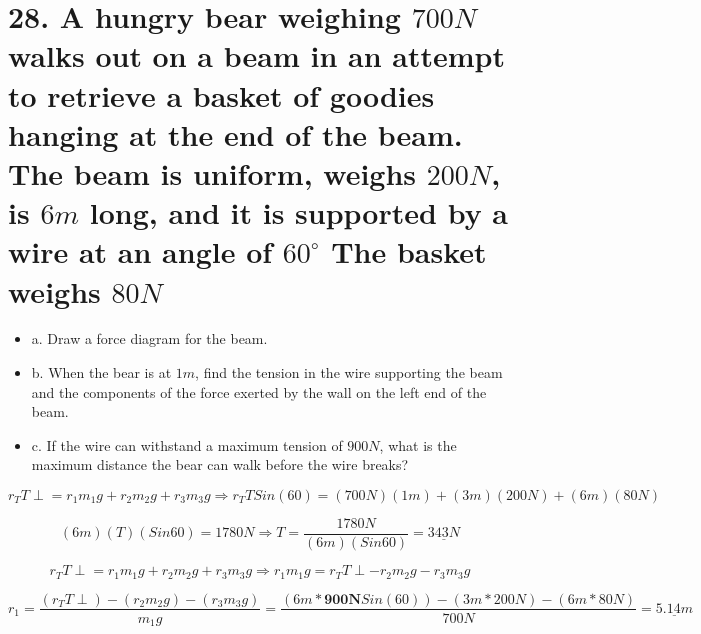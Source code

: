 \documentclass{article}
\begin{document}
\begin{center}
\end{center}


\section {28. A hungry bear weighing $700 N$ walks out on a beam in an attempt to retrieve a basket of goodies hanging at the end of the beam. The beam is uniform, weighs $200 N$, is $6 m$ long, and it is supported by a wire at an angle of $60^\circ$ The basket weighs $80 N$}

\begin{itemize}
    \item a. Draw a force diagram for the beam.
    \item b. When the bear is at $1 m$, find the tension in the wire supporting the beam and the components of the force exerted by the wall on the left end of the beam.
    \item c. If the wire can withstand a maximum tension of
    $900 N$, what is the maximum distance the bear can walk before the wire breaks?
\end{itemize}

\begin{trivlist}

    \item $$r_T T\perp = r_1 m_1 g + r_2 m_2 g + r_3 m_3 g \Rightarrow r_T T Sin(60) = (700N)(1m) + (3m)(200N) + (6m)(80N)$$
    \item $$(6m)(T)(Sin60) = 1780N \Rightarrow T = \frac{1780N}{(6m)(Sin60)} = \underline{343N}$$
    
    \item $$r_T T \perp = r_1 m_1 g + r_2 m_2 g + r_3 m_3 g \Rightarrow r_1 m_1 g = r_T T\perp - r_2 m_2 g - r_3 m_3 g$$
    \item $$r_1 = \frac{(r_T T\perp)-(r_2 m_2 g)-(r_3 m_3 g)}{m_1 g} = \frac{(6m * \textbf{900N} Sin(60)) - (3m * 200N) - (6m * 80N)}{700N} = \underline{5.14 m}$$
    \end{trivlist}
\end{document}
